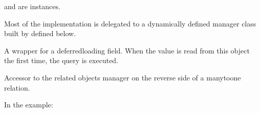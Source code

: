 \documentclass[letterpaper,10pt,english]{sphinxmanual}
\begin{document}
\begin{fulllineitems}
\begin{fulllineitems}
\sphinxAtStartPar
{} and  are 
instances.

\sphinxAtStartPar
Most of the implementation is delegated to a dynamically defined manager
class built by  defined below.

\end{fulllineitems}


\begin{fulllineitems}
\label{\detokenize{app:app.models.resource_name.name}}
\pysigstartsignatures
{}
\pysigstopsignatures
\sphinxAtStartPar
A wrapper for a deferred\sphinxhyphen{}loading field. When the value is read from this
object the first time, the query is executed.

\end{fulllineitems}


\begin{fulllineitems}
\label{\detokenize{app:app.models.resource_name.objects}}
\pysigstartsignatures
{}
\pysigstopsignatures
\end{fulllineitems}


\begin{fulllineitems}
\label{\detokenize{app:app.models.resource_name.resource}}
\pysigstartsignatures
{}
\pysigstopsignatures
\sphinxAtStartPar
Accessor to the related objects manager on the reverse side of a
many\sphinxhyphen{}to\sphinxhyphen{}one relation.

\sphinxAtStartPar
In the example:

\begin{sphinxVerbatim}[commandchars=\\\{\}]
 
       
\end{sphinxVerbatim}


\end{fulllineitems}
\end{fulllineitems}
\end{document}
